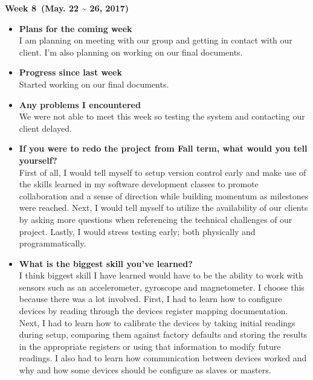 	\begin{center}
		\textbf{Week 8 (May. 22 {\textasciitilde{}} 26, 2017)}
	\end{center}
	\begin{itemize}
		\item \textbf{Plans for the coming week}
		\\I am planning on meeting with our group and getting in contact with our client. I'm also planning on working on our final documents.\\

		\item \textbf{Progress since last week}
		\\Started working on our final documents.\\

		\item \textbf{Any problems I encountered}
		\\We were not able to meet this week so testing the system and contacting our client delayed.\\

		\item \textbf{If you were to redo the project from Fall term, what would you tell yourself?}
		\\First of all, I would tell myself to setup version control early and make use of the skills learned in my software development classes to promote collaboration and a sense of direction while building momentum as milestones were reached. Next, I would tell myself to utilize the availability of our clients by asking more questions when referencing the technical challenges of our project. Lastly, I would stress testing early; both physically and programmatically.\\

		\item \textbf{What is the biggest skill you've learned?}
		\\ I think biggest skill I have learned would have to be the ability to work with sensors such as an accelerometer, gyroscope and magnetometer. I choose this because there was a lot involved. First, I had to learn how to configure devices by reading through the devices register mapping documentation. Next, I had to learn how to calibrate the devices by taking initial readings during setup, comparing them against factory defaults and storing the results in the appropriate registers or using that information to modify future readings. I also had to learn how communication between devices worked and why and how some devices should be configure as slaves or masters.\\


\end{itemize}
